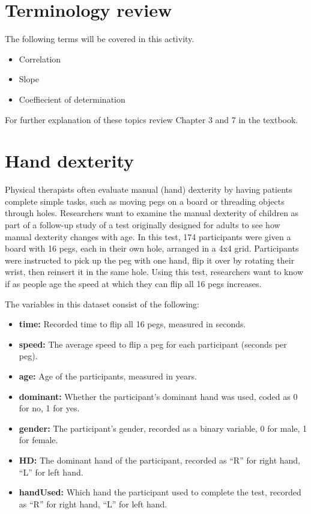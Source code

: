 \documentclass[
]{report}
\begin{document}
\hypertarget{terminology-review}{%
\section{Terminology review}\label{terminology-review}}

The following terms will be covered in this activity.

\begin{itemize}
\item
  Correlation
\item
  Slope
\item
  Coeffiecient of determination
\end{itemize}

For further explanation of these topics review Chapter 3 and 7 in the textbook.

\hypertarget{hand-dexterity-1}{%
\section{Hand dexterity}\label{hand-dexterity-1}}

Physical therapists often evaluate manual (hand) dexterity by having patients complete simple tasks, such as moving pegs on a board or threading objects through holes. Researchers want to examine the manual dexterity of children as part of a follow-up study of a test originally designed for adults to see how manual dexterity changes with age. In this test, 174 participants were given a board with 16 pegs, each in their own hole, arranged in a 4x4 grid. Participants were instructed to pick up the peg with one hand, flip it over by rotating their wrist, then reinsert it in the same hole. Using this test, researchers want to know if as people age the speed at which they can flip all 16 pegs increases.

The variables in this dataset consist of the following:

\begin{itemize}
\item
  \textbf{time:} Recorded time to flip all 16 pegs, measured in seconds.
\item
  \textbf{speed:} The average speed to flip a peg for each participant (seconds per peg).
\item
  \textbf{age:} Age of the participants, measured in years.
\item
  \textbf{dominant:} Whether the participant's dominant hand was used, coded as 0 for no, 1 for yes.
\item
  \textbf{gender:} The participant's gender, recorded as a binary variable, 0 for male, 1 for female.
\item
  \textbf{HD:} The dominant hand of the participant, recorded as ``R'' for right hand, ``L'' for left hand.
\item
  \textbf{handUsed:} Which hand the participant used to complete the test, recorded as ``R'' for right hand, ``L'' for left hand.
\end{itemize}
\end{document}
